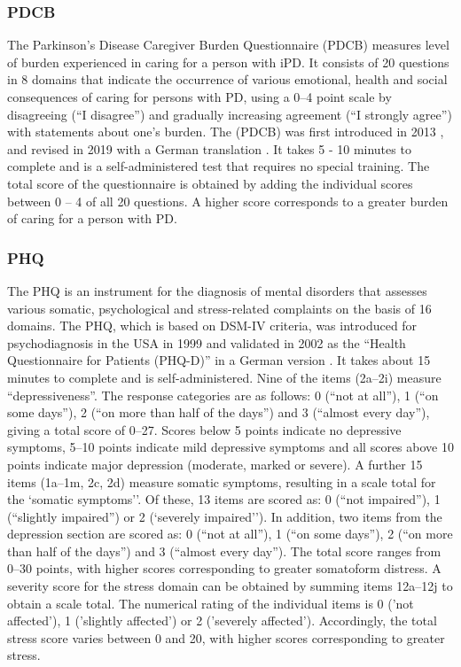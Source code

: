 \QPsychometrics{}

\subsubsection{\acf{PDCB}}
\label{questionnaires:PDCB}
The Parkinson's Disease Caregiver Burden Questionnaire (\acs{PDCB}) measures level of burden experienced in caring for a person with \ac{iPD}. It consists of 20 questions in 8 domains that indicate the occurrence of various emotional, health and social consequences of caring for persons with \ac{PD}, using a 0--4 point scale by disagreeing (``I disagree'') and gradually increasing agreement (``I strongly agree'') with statements about one's burden. The (\acs{PDCB}) was first introduced in 2013 \cite{zhong2013pdcb}, and revised in 2019 with a German translation \cite{klietz2019pdcb}. It takes 5 - 10 minutes to complete and is a self-administered test that requires no special training. The total score of the questionnaire is obtained by adding the individual scores between 0 -- 4 of all 20 questions. A higher score corresponds to a greater burden of caring for a person with \ac{PD}.

\QPsychometrics{}

\subsubsection{\acf{PHQ}}
\label{questionnaires:PHQ}
The \acs{PHQ} is an instrument for the diagnosis of mental disorders that assesses various somatic, psychological and stress-related complaints on the basis of 16 domains. The \acs{PHQ}, which is based on DSM-IV criteria, was introduced for psychodiagnosis in the USA in 1999 \cite{spitzer1999phq} and validated in 2002 as the ``Health Questionnaire for Patients (PHQ-D)'' in a German version \cite{lowe2002phq}. It takes about 15 minutes to complete and is self-administered. Nine of the items (2a--2i) measure ``depressiveness''. The response categories are as follows: 0 (``not at all''), 1 (``on some days''), 2 (``on more than half of the days'') and 3 (``almost every day''), giving a total score of 0--27. Scores below 5 points indicate no depressive symptoms, 5--10 points indicate mild depressive symptoms and all scores above 10 points indicate major depression (moderate, marked or severe). A further 15 items (1a--1m, 2c, 2d) measure somatic symptoms, resulting in a scale total for the `somatic symptoms''. Of these, 13 items are scored as: 0 (``not impaired''), 1 (``slightly impaired'') or 2 (`severely impaired''). In addition, two items from the depression section are scored as: 0 (``not at all''), 1 (``on some days''), 2 (``on more than half of the days'') and 3 (``almost every day''). The total score ranges from 0--30 points, with higher scores corresponding to greater somatoform distress. 
A severity score for the stress domain can be obtained by summing items 12a--12j to obtain a scale total. The numerical rating of the individual items is 0 ('not affected'), 1 ('slightly affected') or 2 ('severely affected'). Accordingly, the total stress score varies between 0 and 20, with higher scores corresponding to greater stress.

